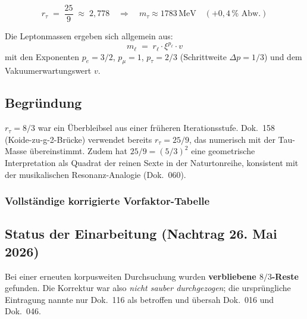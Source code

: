 \begin{equation}
  \boxed{r_\tau \;=\; \frac{25}{9} \;\approx\; 2{,}778}
  \quad \Rightarrow \quad
  m_\tau \approx 1783\,\text{MeV} \quad (+0{,}4\,\% \text{ Abw.})
  \tag{190.2}
\end{equation}

Die Leptonmassen ergeben sich allgemein aus:
\begin{equation}
  m_\ell \;=\; r_\ell \cdot \xi^{p_\ell} \cdot v
  \tag{190.3}
\end{equation}
mit den Exponenten $p_e = 3/2$, $p_\mu = 1$, $p_\tau = 2/3$
(Schrittweite $\Delta p = 1/3$) und dem Vakuumerwartungswert $v$.

\subsection*{Begründung}

$r_\tau = 8/3$ war ein Überbleibsel aus einer früheren Iterationsstufe.
Dok.~158 (Koide-zu-g-2-Brücke) verwendet bereits $r_\tau = 25/9$, das
numerisch mit der Tau-Masse übereinstimmt. Zudem hat $25/9 = (5/3)^2$
eine geometrische Interpretation als Quadrat der reinen Sexte in der
Naturtonreihe, konsistent mit der musikalischen Resonanz-Analogie
(Dok.~060).

\subsubsection*{Vollständige korrigierte Vorfaktor-Tabelle}

\begin{center}
{\footnotesize
{}
} %
\end{center}

\subsection*{Status der Einarbeitung (Nachtrag 26. Mai 2026)}

Bei einer erneuten korpusweiten Durchsuchung wurden \textbf{verbliebene
$8/3$-Reste} gefunden. Die Korrektur war also \emph{nicht sauber
durchgezogen}; die ursprüngliche Eintragung nannte nur Dok.~116 als
betroffen und übersah Dok.~016 und Dok.~046.

